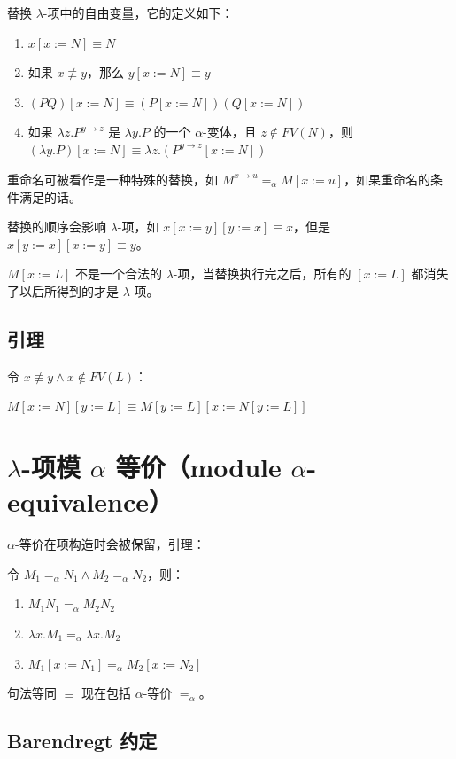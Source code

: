 \documentclass[UTF8]{article}
\begin{document}
	替换 $\lambda$-项中的自由变量，它的定义如下：
	\begin{enumerate}
		\item $x[x:=N]\equiv N$
		\item 如果 $x \not \equiv{y}$，那么 $y[x:=N]\equiv y$
		\item $(PQ)[x:=N]\equiv (P[x:=N])(Q[x:=N])$
		\item 如果 $\lambda z. P^{y\rightarrow z}$ 是 $\lambda y.P$ 的一个 $\alpha$-变体，且 $z \notin FV(N)$，则 $(\lambda y. P)[x:=N]\equiv \lambda z.(P^{y\rightarrow z}[x:=N])$
	\end{enumerate}

	重命名可被看作是一种特殊的替换，如 $M^{x\rightarrow u} =_\alpha M[x:=u]$，如果重命名的条件满足的话。

	替换的顺序会影响 $\lambda$-项，如 $x[x:=y][y:=x]\equiv x$，但是 $x[y:=x][x:=y]\equiv y$。

	$M[x:=L]$ 不是一个合法的 $\lambda$-项，当替换执行完之后，所有的 $[x:=L]$ 都消失了以后所得到的才是 $\lambda$-项。

\subsection{引理}

	令 $x \not \equiv{y} \land x \notin FV(L)$：

	$M[x:=N][y:=L]\equiv M[y:=L][x:=N[y:=L]]$

\section{$\lambda$-项模 $\alpha$ 等价（module $\alpha$-equivalence）}

	$\alpha$-等价在项构造时会被保留，引理：

	令 $M_1 =_\alpha N_1 \land M_2 =_\alpha N_2$，则：
	\begin{enumerate}
		\item $M_1 N_1 =_\alpha M_2 N_2$
		\item $\lambda x. M_1 =_\alpha \lambda x. M_2$
		\item $M_1[x:=N_1]=_\alpha M_2[x:=N_2]$
	\end{enumerate}

	句法等同 $\equiv$ 现在包括 $\alpha$-等价 $=_\alpha$。

\subsection{Barendregt 约定}
\end{document}
